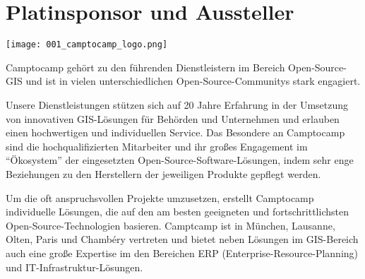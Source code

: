 \section*{Platinsponsor und Aussteller}
\begin{center}
  \texttt{[image: 001\_camptocamp\_logo.png]}
\end{center}
Camptocamp gehört zu den führenden Dienstleistern im Bereich Open-Source-GIS und ist in vielen unterschiedlichen Open-Source-Communitys stark engagiert.

Unsere Dienstleistungen stützen sich auf 20 Jahre Erfahrung in der Umsetzung von innovativen GIS-Lösungen für Behörden und Unternehmen und erlauben einen hochwertigen und individuellen Service. Das Besondere an Camptocamp sind die hochqualifizierten Mitarbeiter und ihr großes Engagement im "`Ökosystem"' der eingesetzten Open-Source-Software-Lösungen, indem sehr enge Beziehungen zu den Herstellern der jeweiligen Produkte gepflegt werden.

Um die oft anspruchsvollen Projekte umzusetzen, erstellt Camptocamp individuelle Lösungen, die auf den am besten geeigneten und fortschrittlichsten Open-Source-Technologien basieren. Camptcamp ist in München, Lausanne, Olten, Paris und Chambéry vertreten und bietet neben Lösungen im GIS-Bereich auch eine große Expertise im den Bereichen ERP (Enterprise-Resource-Planning) und IT-Infrastruktur-Lösungen.

